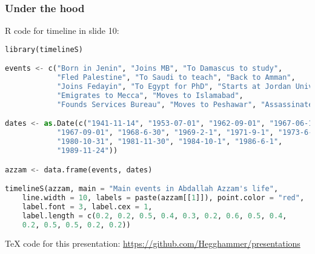 \documentclass{beamer}
\begin{document}
\begin{frame}[fragile]
\frametitle{Under the hood}
R code for timeline in slide 10: \newline
\newline
\tiny{\begin{lstlisting}[showstringspaces=false, language=Python]
library(timelineS)

events <- c("Born in Jenin", "Joins MB", "To Damascus to study", 
            "Fled Palestine", "To Saudi to teach", "Back to Amman", 
            "Joins Fedayin", "To Egypt for PhD", "Starts at Jordan University", 
            "Emigrates to Mecca", "Moves to Islamabad", 
            "Founds Services Bureau", "Moves to Peshawar", "Assassinated")

dates <- as.Date(c("1941-11-14", "1953-07-01", "1962-09-01", "1967-06-10", 
            "1967-09-01", "1968-6-30", "1969-2-1", "1971-9-1", "1973-6-30", 
            "1980-10-31", "1981-11-30", "1984-10-1", "1986-6-1", 
            "1989-11-24"))

azzam <- data.frame(events, dates)

timelineS(azzam, main = "Main events in Abdallah Azzam's life", 
    line.width = 10, labels = paste(azzam[[1]]), point.color = "red", 
    label.font = 3, label.cex = 1, 
    label.length = c(0.2, 0.2, 0.5, 0.4, 0.3, 0.2, 0.6, 0.5, 0.4, 
    0.2, 0.5, 0.5, 0.2, 0.2))
\end{lstlisting}}
TeX code for this presentation: \url{https://github.com/Hegghammer/presentations}
\end{frame}
\end{document}
